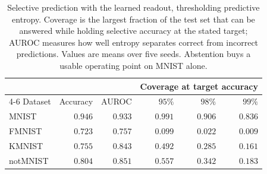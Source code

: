 \begin{table}[t]
\centering
\caption{Selective prediction with the learned readout, thresholding predictive entropy.
Coverage is the largest fraction of the test set that can be answered while holding
selective accuracy at the stated target; AUROC measures how well entropy separates correct
from incorrect predictions. Values are means over five seeds. Abstention buys a usable
operating point on MNIST alone.}
\label{tab:selective}
\begin{tabular}{lrrrrr}
\toprule
& & & \multicolumn{3}{c}{Coverage at target accuracy} \\
\cmidrule(lr){4-6}
Dataset & Accuracy & AUROC & $95\%$ & $98\%$ & $99\%$ \\
\midrule
MNIST & $0.946$ & $0.933$ & $0.991$ & $0.906$ & $0.836$ \\
FMNIST & $0.723$ & $0.757$ & $0.099$ & $0.022$ & $0.009$ \\
KMNIST & $0.755$ & $0.843$ & $0.492$ & $0.285$ & $0.161$ \\
notMNIST & $0.804$ & $0.851$ & $0.557$ & $0.342$ & $0.183$ \\
\bottomrule
\end{tabular}
\end{table}
